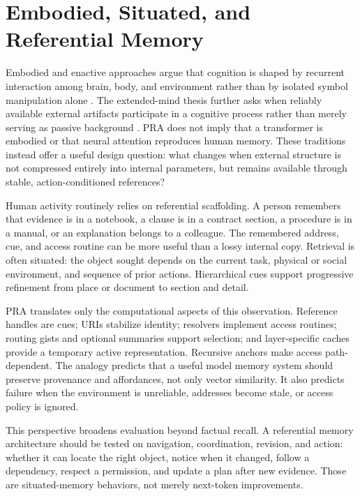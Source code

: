 \documentclass[11pt]{article}
\begin{document}
\section{Embodied, Situated, and Referential Memory}

Embodied and enactive approaches argue that cognition is shaped by recurrent interaction among brain, body, and environment rather than by isolated symbol manipulation alone \cite{varela1991embodied}. The extended-mind thesis further asks when reliably available external artifacts participate in a cognitive process rather than merely serving as passive background \cite{clark1998extended}. PRA does not imply that a transformer is embodied or that neural attention reproduces human memory. These traditions instead offer a useful design question: what changes when external structure is not compressed entirely into internal parameters, but remains available through stable, action-conditioned references?

Human activity routinely relies on referential scaffolding. A person remembers that evidence is in a notebook, a clause is in a contract section, a procedure is in a manual, or an explanation belongs to a colleague. The remembered address, cue, and access routine can be more useful than a lossy internal copy. Retrieval is often situated: the object sought depends on the current task, physical or social environment, and sequence of prior actions. Hierarchical cues support progressive refinement from place or document to section and detail.

PRA translates only the computational aspects of this observation. Reference handles are cues; URIs stabilize identity; resolvers implement access routines; routing gists and optional summaries support selection; and layer-specific caches provide a temporary active representation. Recursive anchors make access path-dependent. The analogy predicts that a useful model memory system should preserve provenance and affordances, not only vector similarity. It also predicts failure when the environment is unreliable, addresses become stale, or access policy is ignored.

This perspective broadens evaluation beyond factual recall. A referential memory architecture should be tested on navigation, coordination, revision, and action: whether it can locate the right object, notice when it changed, follow a dependency, respect a permission, and update a plan after new evidence. Those are situated-memory behaviors, not merely next-token improvements.
\end{document}
